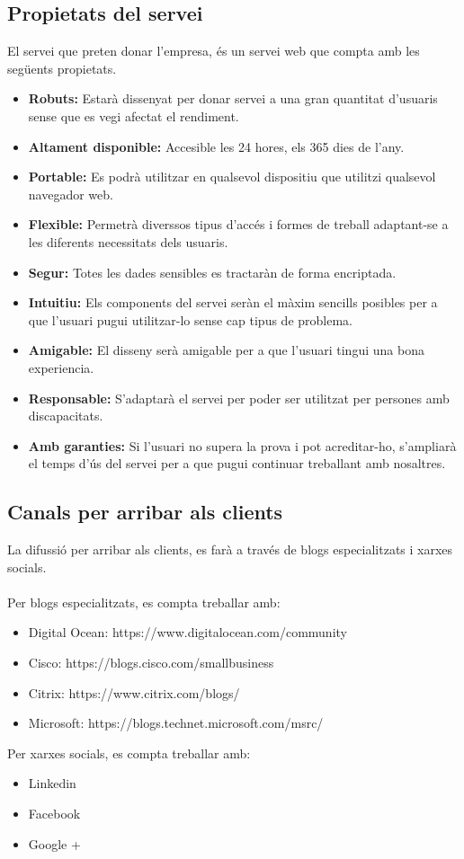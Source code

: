 \documentclass[12pt]{article}
\begin{document}
\subsection{Propietats del servei}
El servei que preten donar l'empresa, és un servei web que compta amb les següents propietats.
\begin{itemize}
	\item \textbf{Robuts:} Estarà dissenyat per donar servei a una gran quantitat d'usuaris sense que es vegi afectat el rendiment.
	\item \textbf{Altament disponible:} Accesible les 24 hores, els 365 dies de l'any.
	\item \textbf{Portable:} Es podrà utilitzar en qualsevol dispositiu que utilitzi qualsevol navegador web.
	\item \textbf{Flexible:} Permetrà diverssos tipus d'accés i formes de treball adaptant-se a les diferents necessitats dels usuaris.
	\item \textbf{Segur:} Totes les dades sensibles es tractaràn de forma encriptada.
	\item \textbf{Intuitiu:} Els components del servei seràn el màxim sencills posibles per a que l'usuari pugui utilitzar-lo sense cap tipus de problema.
	\item \textbf{Amigable:} El disseny serà amigable per a que l'usuari tingui una bona experiencia.
	\item \textbf{Responsable:} S'adaptarà el servei per poder ser utilitzat per persones amb discapacitats.
	\item \textbf{Amb garanties:} Si l'usuari no supera la prova i pot acreditar-ho, s'ampliarà el temps d'ús del servei per a que pugui continuar treballant amb nosaltres.
\end{itemize} 
\subsection{Canals per arribar als clients}
La difussió per arribar als clients, es farà a través de blogs especialitzats i xarxes socials.
\\\\Per blogs especialitzats, es compta treballar amb:
\begin{itemize}
	\item Digital Ocean: https://www.digitalocean.com/community
	\item Cisco: https://blogs.cisco.com/smallbusiness
	\item Citrix: https://www.citrix.com/blogs/
	\item Microsoft: https://blogs.technet.microsoft.com/msrc/
\end{itemize}
Per xarxes socials, es compta treballar amb:
\begin{itemize}
	\item Linkedin
	\item Facebook
	\item Google +
\end{itemize}
\end{document}
